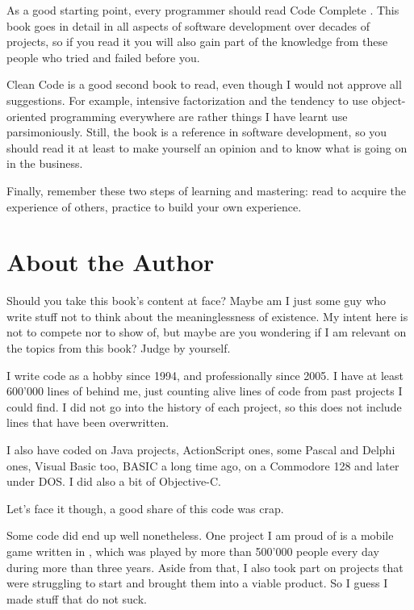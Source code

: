 As a good starting point, every programmer should read Code Complete
\cite{code-complete}. This book goes in detail in all aspects of
software development over decades of projects, so if you read it you
will also gain part of the knowledge from these people who tried and
failed before you.

Clean Code \cite{clean-code} is a good second book to read, even
though I would not approve all suggestions. For example, intensive
factorization and the tendency to use object-oriented programming
everywhere are rather things I have learnt use parsimoniously. Still,
the book is a reference in software development, so you should read it
at least to make yourself an opinion and to know what is going on in
the business.

\bigskip

Finally, remember these two steps of learning and mastering: read to
acquire the experience of others, practice to build your own
experience.

\section{About the Author}

Should you take this book's content at face? Maybe am I just some guy
who write stuff not to think about the meaninglessness of
existence. My intent here is not to compete nor to show of, but maybe
are you wondering if I am relevant on the topics from this book? Judge
by yourself.

I write code as a hobby since 1994, and professionally since 2005. I
have at least 600'000 lines of \cpp behind me, just counting alive
lines of code from past projects I could find. I did not go into the
history of each project, so this does not include lines that have been
overwritten.

I also have coded on Java projects, ActionScript ones, some Pascal and
Delphi ones, Visual Basic too, BASIC a long time ago, on a Commodore
128 and later under DOS. I did also a bit of Objective-C.

Let's face it though, a good share of this code was crap.

Some code did end up well nonetheless. One project I am proud of is a
mobile game written in \cpp, which was played by more than 500'000
people every day during more than three years. Aside from that, I also
took part on projects that were struggling to start and brought them
into a viable product. So I guess I made stuff that do not suck.

